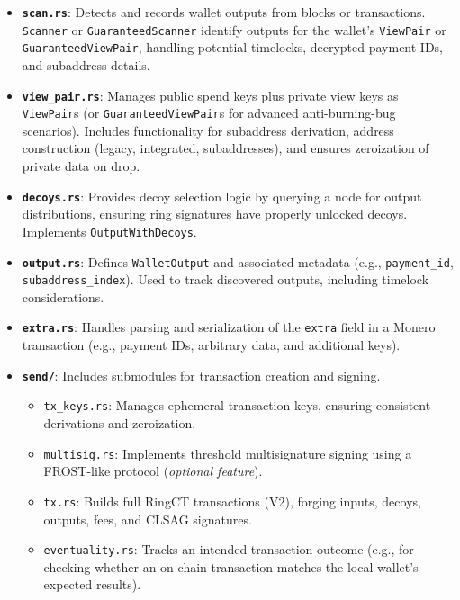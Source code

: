 \documentclass[12pt,a4paper]{article}
\begin{document}
\begin{itemize}
  \item \textbf{\texttt{scan.rs}}: Detects and records wallet outputs from blocks or transactions.  
  \texttt{Scanner} or \texttt{GuaranteedScanner} identify outputs for the wallet's
  \texttt{ViewPair} or \texttt{GuaranteedViewPair}, handling potential timelocks, decrypted
  payment IDs, and subaddress details.

  \item \textbf{\texttt{view\_pair.rs}}: Manages public spend keys plus private view keys as 
  \texttt{ViewPair}s (or \texttt{GuaranteedViewPair}s for advanced anti-burning-bug scenarios). 
  Includes functionality for subaddress derivation, address construction (legacy, integrated, 
  subaddresses), and ensures zeroization of private data on drop.

  \item \textbf{\texttt{decoys.rs}}: Provides decoy selection logic by querying a node for 
  output distributions, ensuring ring signatures have properly unlocked decoys. 
  Implements \texttt{OutputWithDecoys}.

  \item \textbf{\texttt{output.rs}}: Defines \texttt{WalletOutput} and associated metadata 
  (e.g., \texttt{payment\_id}, \texttt{subaddress\_index}). Used to track discovered
  outputs, including timelock considerations.

  \item \textbf{\texttt{extra.rs}}: Handles parsing and serialization of the \texttt{extra} 
  field in a Monero transaction (e.g., payment IDs, arbitrary data, and additional keys).

  \item \textbf{\texttt{send/}}: Includes submodules for transaction creation and signing.
    \begin{itemize}
      \item \texttt{tx\_keys.rs}: Manages ephemeral transaction keys, ensuring consistent
      derivations and zeroization.
      \item \texttt{multisig.rs}: Implements threshold multisignature signing using a
      FROST-like protocol (\textit{optional feature}).
      \item \texttt{tx.rs}: Builds full RingCT transactions (V2), forging inputs, decoys, outputs,
      fees, and CLSAG signatures.
      \item \texttt{eventuality.rs}: Tracks an intended transaction outcome (e.g., for checking
      whether an on-chain transaction matches the local wallet's expected results).
    \end{itemize}
\end{itemize}
\end{document}

